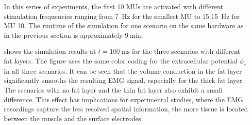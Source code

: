 In this series of experiments, the first 10 MUs are activated with different stimulation frequencies ranging from \SI{7}{\hertz} for the smallest MU to \SI{15.15}{\hertz} for MU 10. The runtime of the simulation for one scenario on the same hardware as in the previous section is approximately $\SI{9}{\minute}$.

 shows the simulation results at $t=\SI{100}{\milli\second}$ for the three scenarios with different fat layers. The figure uses the same color coding for the extracellular potential $\phi_e$ in all three scenarios. It can be seen that the volume conduction in the fat layer significantly smooths the resulting EMG signal, especially for the thick fat layer. The scenarios with no fat layer and the thin fat layer also exhibit a small difference.
This effect has implications for experimental studies, where the EMG recordings capture the less resolved spatial information, the more tissue is located between the muscle and the surface electrodes.

